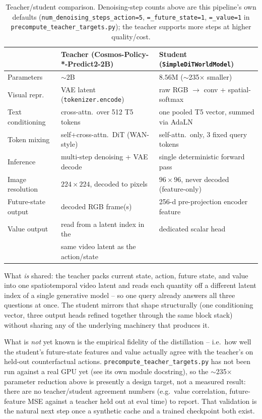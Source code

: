 \documentclass[11pt]{article}
\begin{document}
\begin{table}[h]
\centering
\begin{tabular}{@{}lll@{}}
\toprule
& \textbf{Teacher (Cosmos-Policy-*-Predict2-2B)} & \textbf{Student (\texttt{SimpleDiTWorldModel})} \\
\midrule
Parameters & $\sim 2$B & $8.56$M ($\sim$235$\times$ smaller) \\
Visual repr. & VAE latent (\texttt{tokenizer.encode}) & raw RGB $\to$ conv + spatial-softmax \\
Text conditioning & cross-attn.\ over 512 T5 tokens & one pooled T5 vector, summed via AdaLN \\
Token mixing & self+cross-attn.\ DiT (WAN-style) & self-attn.\ only, 3 fixed query tokens \\
Inference & multi-step denoising + VAE decode & single deterministic forward pass \\
Image resolution & $224\times224$, decoded to pixels & $96\times96$, never decoded (feature-only) \\
Future-state output & decoded RGB frame(s) & 256-d pre-projection encoder feature \\
Value output & read from a latent index in the & dedicated scalar head \\
& same video latent as the action/state & \\
\bottomrule
\end{tabular}
\caption{Teacher/student comparison. Denoising-step counts above are this pipeline's own defaults
(\texttt{num\_denoising\_steps\_action=5}, \texttt{=\_future\_state=1}, \texttt{=\_value=1} in
\texttt{precompute\_teacher\_targets.py}); the teacher supports more steps at higher quality/cost.}
\label{tab:teacher-vs-student}
\end{table}

What \emph{is} shared: the teacher packs current state, action, future state, and value into one
spatiotemporal video latent and reads each quantity off a different latent index of a single
generative model -- so one query already answers all three questions at once. The student mirrors
that shape structurally (one conditioning vector, three output heads refined together through the
same block stack) without sharing any of the underlying machinery that produces it.

What is \emph{not} yet known is the empirical fidelity of the distillation -- i.e.\ how well the
student's future-state features and value actually agree with the teacher's on held-out
counterfactual actions. \texttt{precompute\_teacher\_targets.py} has not been run against a real
GPU yet (see its own module docstring), so the $\sim$235$\times$ parameter reduction above is
presently a design target, not a measured result: there are no teacher/student agreement numbers
(e.g.\ value correlation, future-feature MSE against a teacher held out at eval time) to report.
That validation is the natural next step once a synthetic cache and a trained checkpoint both
exist.
\end{document}
